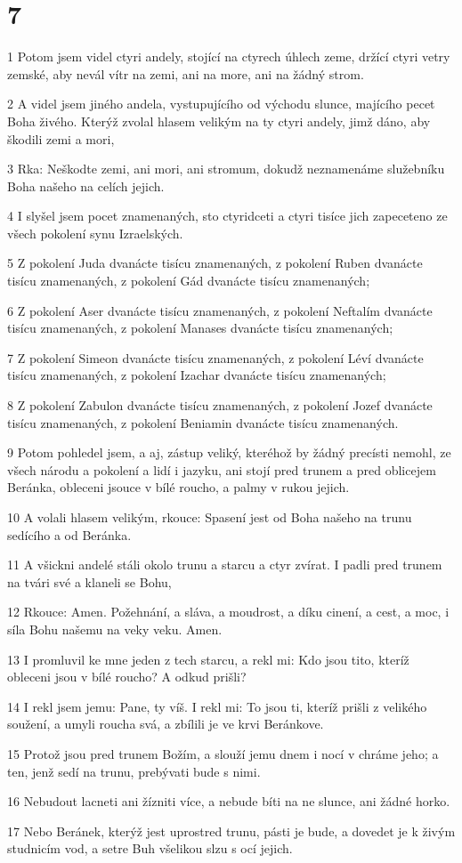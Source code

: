 \chapter{7}

\par 1 Potom jsem videl ctyri andely, stojící na ctyrech úhlech zeme, držící ctyri vetry zemské, aby nevál vítr na zemi, ani na more, ani na žádný strom.
\par 2 A videl jsem jiného andela, vystupujícího od východu slunce, majícího pecet Boha živého. Kterýž zvolal hlasem velikým na ty ctyri andely, jimž dáno, aby škodili zemi a mori,
\par 3 Rka: Neškodte zemi, ani mori, ani stromum, dokudž neznamenáme služebníku Boha našeho na celích jejich.
\par 4 I slyšel jsem pocet znamenaných, sto ctyridceti a ctyri tisíce jich zapeceteno ze všech pokolení synu Izraelských.
\par 5 Z pokolení Juda dvanácte tisícu znamenaných, z pokolení Ruben dvanácte tisícu znamenaných, z pokolení Gád dvanácte tisícu znamenaných;
\par 6 Z pokolení Aser dvanácte tisícu znamenaných, z pokolení Neftalím dvanácte tisícu znamenaných, z pokolení Manases dvanácte tisícu znamenaných;
\par 7 Z pokolení Simeon dvanácte tisícu znamenaných, z pokolení Léví dvanácte tisícu znamenaných, z pokolení Izachar dvanácte tisícu znamenaných;
\par 8 Z pokolení Zabulon dvanácte tisícu znamenaných, z pokolení Jozef dvanácte tisícu znamenaných, z pokolení Beniamin dvanácte tisícu znamenaných.
\par 9 Potom pohledel jsem, a aj, zástup veliký, kteréhož by žádný precísti nemohl, ze všech národu a pokolení a lidí i jazyku, ani stojí pred trunem a pred oblicejem Beránka, obleceni jsouce v bílé roucho, a palmy v rukou jejich.
\par 10 A volali hlasem velikým, rkouce: Spasení jest od Boha našeho na trunu sedícího a od Beránka.
\par 11 A všickni andelé stáli okolo trunu a starcu a ctyr zvírat. I padli pred trunem na tvári své a klaneli se Bohu,
\par 12 Rkouce: Amen. Požehnání, a sláva, a moudrost, a díku cinení, a cest, a moc, i síla Bohu našemu na veky veku. Amen.
\par 13 I promluvil ke mne jeden z tech starcu, a rekl mi: Kdo jsou tito, kteríž obleceni jsou v bílé roucho? A odkud prišli?
\par 14 I rekl jsem jemu: Pane, ty víš. I rekl mi: To jsou ti, kteríž prišli z velikého soužení, a umyli roucha svá, a zbílili je ve krvi Beránkove.
\par 15 Protož jsou pred trunem Božím, a slouží jemu dnem i nocí v chráme jeho; a ten, jenž sedí na trunu, prebývati bude s nimi.
\par 16 Nebudout lacneti ani žízniti více, a nebude bíti na ne slunce, ani žádné horko.
\par 17 Nebo Beránek, kterýž jest uprostred trunu, pásti je bude, a dovedet je k živým studnicím vod, a setre Buh všelikou slzu s ocí jejich.

